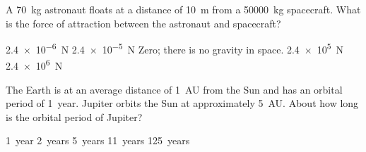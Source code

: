 \documentclass{../../../oss-classkick-exam}
\begin{document}
\genheader


\genmultidirections

\gengravity

\raggedcolumns
\begin{multicols*}{2}
  \begin{questions}
    
    \question A \SI{70}{\kilo\gram} astronaut floats at a distance of
    \SI{10}{\metre} from a \SI{50000}{\kilo\gram} spacecraft. What is the force
    of attraction between the astronaut and spacecraft?
    \begin{choices}
      \choice\SI{2.4e-6}{\newton}
      \choice\SI{2.4e-5}{\newton}
      \choice Zero; there is no gravity in space.
      \choice\SI{2.4e5}{\newton}
      \choice\SI{2.4e6}{\newton}
    \end{choices}
    \vspace{.5in}
    
    
    \question The Earth is at an average distance of \SI{1}{AU} from the Sun
    and has an orbital period of \SI{1}{year}. Jupiter orbits the Sun at
    approximately \SI{5}{AU}. About how long is the orbital period of Jupiter?
    \begin{choices}
      \choice\SI{1}{year}
      \choice\SI{2}{years}
      \choice\SI{5}{years}
      \choice\SI{11}{years}
      \choice\SI{125}{years}
    \end{choices}
    

\end{questions}
\end{multicols*}
\end{document}
